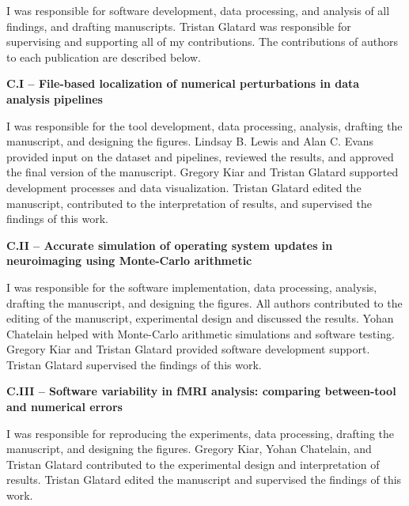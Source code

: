 \begin{authorcontributions}

I was responsible for software development, data processing, and analysis of all findings, and drafting manuscripts. 
Tristan Glatard was responsible for supervising and supporting all of my contributions.
The contributions of authors to each publication are described below.

\textbf{C.I – File-based localization of numerical perturbations in data analysis pipelines~\cite{salari2020spot}}

I was responsible for the tool development, data processing, analysis, drafting the manuscript, and designing the figures.
Lindsay B. Lewis and Alan C. Evans provided input on the dataset and pipelines, reviewed the results, and approved the final version of the manuscript.
Gregory Kiar and Tristan Glatard supported development processes and data visualization.
Tristan Glatard edited the manuscript, contributed to the interpretation of results, and supervised the findings of this work.

\textbf{C.II – Accurate simulation of operating system updates in neuroimaging using Monte-Carlo arithmetic~\cite{salari2021accurate}}

I was responsible for the software implementation, data processing, analysis, drafting the manuscript, and designing the figures.
All authors contributed to the editing of the manuscript, experimental design and discussed the results.
Yohan Chatelain helped with Monte-Carlo arithmetic simulations and software testing.
Gregory Kiar and Tristan Glatard provided software development support.
Tristan Glatard supervised the findings of this work.

\textbf{C.III – Software variability in fMRI analysis: comparing between-tool and numerical errors}

I was responsible for reproducing the experiments, data processing, drafting the manuscript, and designing the figures.
Gregory Kiar, Yohan Chatelain, and Tristan Glatard contributed to the experimental design and interpretation of results.
Tristan Glatard edited the manuscript and supervised the findings of this work.

\end{authorcontributions}